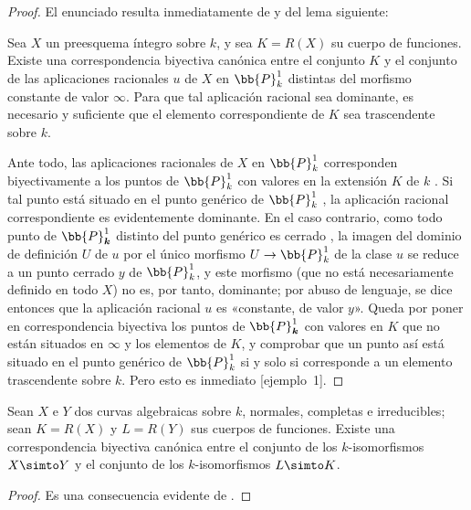\documentclass[oneside,10pt]{amsart}
\makeatletter
\newcommand{\ega@arrow}[2]{\mathchoice{#1}{#2}{#2}{#2}}
\renewcommand{\to}{\ega@arrow{\longrightarrow}{\rightarrow}}
\newcommand{\oldpage}[2][]{\marginnote{\normalfont\footnotesize\textbf{#1}~|~#2}\ignorespaces}
\let\EGAOriginalLabel\label
\renewcommand{\label}[1]{\phantomsection\EGAOriginalLabel{#1}}
\makeatother
\begin{document}
\begin{proof}
El enunciado resulta inmediatamente de  y del lema siguiente:
\begin{lemma}[7.4.15.1]
\label{II.7.4.15.1}
Sea $X$ un preesquema íntegro sobre $k$, y sea $K=R(X)$ su cuerpo de funciones.
Existe una correspondencia biyectiva canónica entre el conjunto $K$ y el conjunto de las aplicaciones racionales $u$ de $X$ en $\bb{P}_k^1$ distintas del morfismo constante de valor $\infty$.
Para que tal aplicación racional sea dominante, es necesario y suficiente que el elemento correspondiente de $K$ sea trascendente sobre $k$.
\end{lemma}
Ante todo, las aplicaciones racionales de $X$ en $\bb{P}_k^1$ corresponden biyectivamente a los puntos de $\bb{P}_k^1$ con valores en la extensión $K$ de $k$ .
Si tal punto está situado en el punto genérico de $\bb{P}_k^1$ , la aplicación racional correspondiente es evidentemente dominante.
En el caso contrario, como todo punto de $\bb{P}_{\boldsymbol{k}}^1$ distinto del punto genérico es cerrado , la imagen del dominio de definición $U$ de $u$ por el único morfismo $U\to\bb{P}_k^1$ de la clase $u$  se reduce a un punto cerrado $y$ de $\bb{P}_k^1$, y este morfismo (que no está necesariamente definido en todo $X$) no es, por tanto, dominante;
por abuso de lenguaje, se dice entonces que la aplicación racional $u$ es «constante, de valor $y$».
Queda por poner en correspondencia biyectiva los puntos de $\bb{P}_{\boldsymbol{k}}^1$ con valores en $K$ que no están situados en $\infty$  y los elementos de $K$, y comprobar que un punto así está situado en el punto genérico de $\bb{P}_k^1$ si y solo si corresponde a un
\oldpage[II]{152}
elemento trascendente sobre $k$.
Pero esto es inmediato [ejemplo~1].
\end{proof}

\begin{corollary}[7.4.16]
\label{II.7.4.16}
Sean $X$ e $Y$ dos curvas algebraicas sobre $k$, \textup{normales, completas} e irreducibles;
sean $K=R(X)$ y $L=R(Y)$ sus cuerpos de funciones.
Existe una correspondencia biyectiva canónica entre el conjunto de los $k$-isomorfismos $X\simto Y$ y el conjunto de los $k$-isomorfismos $L\simto K$.
\end{corollary}

\begin{proof}
Es una consecuencia evidente de .
\end{proof}
\end{document}
